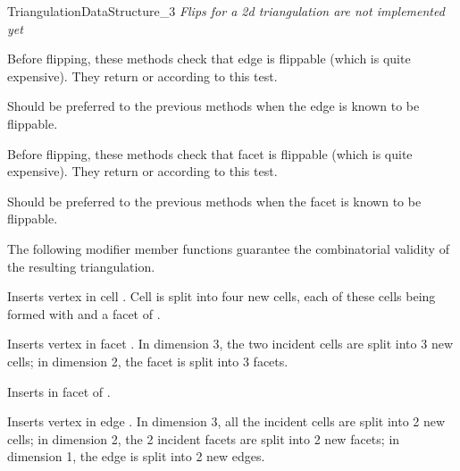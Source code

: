 \begin{ccRefConcept}{TriangulationDataStructure_3}
\textit{Flips for a 2d triangulation are not implemented yet}

\ccGlue
{}
{Before flipping, these methods check that edge  is
flippable (which is quite expensive). They return  or
 according to this test.}

\ccGlue
{}
{Should be preferred to the previous methods when the edge is
known to be flippable.
}

\ccGlue
{}
{Before flipping, these methods check that facet  is
flippable (which is quite expensive). They return  or
 according to this test.} 

\ccGlue
{}
{Should be preferred to the previous methods when the facet is
known to be flippable.
}


The following modifier member functions guarantee
the combinatorial validity of the resulting triangulation.

{Inserts vertex  in cell . Cell  is split into four
new cells, each of these cells being formed with  and a facet
of .
}

{Inserts vertex  in facet . In dimension 3, the two
incident cells are split into 3 new cells; in dimension 2, the facet is
split into 3 facets.
} 

{Inserts  in facet  of .
} 

{Inserts vertex  in edge . In dimension 3, all the
incident cells are split into 2 new cells; in dimension 2, the 2
incident facets are split into 2 new facets; in dimension 1, the edge is 
split into 2 new edges.
} 


\end{ccRefConcept}
